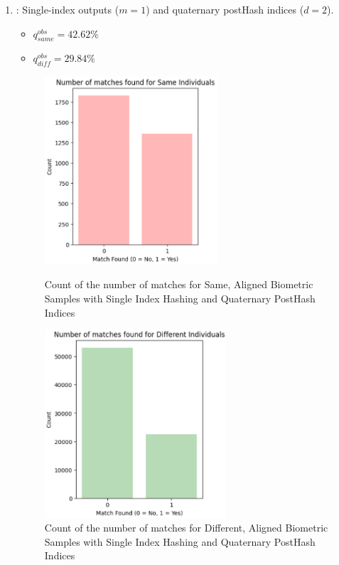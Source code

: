 \begin{enumerate}
    \item {}: Single-index outputs (\(m=1\)) and quaternary postHash indices (\(d=2\)).
    \begin{itemize}
        \item \(q_{same}^{obs} = 42.62\%\)
        \item \(q_{diff}^{obs} = 29.84\%\)
    \end{itemize}

    \begin{figure}[H]
        \centering
        \begin{minipage}[b]{0.48\linewidth}
            \centering
            \includegraphics[width=\linewidth,height=7cm,keepaspectratio]{latex-img/d2same.png}
            \caption{Count of the number of matches for Same, Aligned Biometric Samples with Single Index Hashing and Quaternary PostHash Indices}
            \label{mu_same}
        \end{minipage}
        \hfill
        \begin{minipage}[b]{0.48\linewidth}
            \centering
            \includegraphics[width=\linewidth,height=7cm,keepaspectratio]{latex-img/d2diff.png}
            \caption{Count of the number of matches for Different, Aligned Biometric Samples with Single Index Hashing and Quaternary PostHash Indices}
            \label{mu_diff}
        \end{minipage}
    \end{figure}
    

\end{enumerate}
